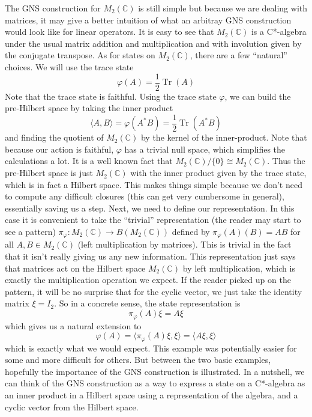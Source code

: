 \begin{example}
The GNS construction for \( M_2(\mathbb{C}) \) is still simple but because we are
dealing with matrices, it may give a better intuition of what an arbitray GNS construction
would look like for linear operators. It is easy to see that $M_2(\mathbb{C})$ is a
C*-algebra under the usual matrix addition and multiplication and with involution
given by the conjugate transpose. As for states on $M_2(\mathbb{C})$, there are
a few ``natural'' choices. We will use the trace state
\begin{equation*}
    \varphi(A) = \frac{1}{2} \operatorname{Tr}(A)
\end{equation*}
Note that the trace state is faithful. Using the trace state $\varphi$, we can
build the pre-Hilbert space by taking the inner product
\begin{equation*}
    \langle A,B \rangle = \varphi(A^*B) = \frac{1}{2}\operatorname{Tr}(A^*B)    
\end{equation*}
and finding the quotient of $M_2(\mathbb{C})$ by the kernel of the inner-product.
Note that because our action is faithful, $\varphi$ has a trivial null space, which
simplifies the calculations a lot. It is a well known fact that $M_2(\mathbb{C})/\{0\} \cong M_2(\mathbb{C})$.
Thus the pre-Hilbert space is just $M_2(\mathbb{C})$ with the inner product given
by the trace state, which is in fact a Hilbert space. This makes things simple because
we don't need to compute any difficult closures (this can get very cumbersome in general),
essentially saving us a step. Next, we need to define our representation. In this case
it is convenient to take the ``trivial'' representation (the reader may start to see a pattern)
$\pi_\varphi: M_2(\mathbb{C}) \to B(M_2(\mathbb{C}))$
defined by $\pi_\varphi(A)(B) = AB$ for all $A,B \in M_2(\mathbb{C})$
(left multiplication by matrices). This is trivial in the fact that it isn't really
giving us any new information. This representation just says that matrices act on the Hilbert space
$M_2(\mathbb{C})$ by left multiplication, which is exactly the multiplication operation
we expect. If the reader picked up on the pattern, it will be no surprise that for the
cyclic vector, we just take the identity matrix $\xi = I_2$. So in a concrete sense,
the state representation is
\begin{equation*}
    \pi_\varphi (A) \xi = A \xi
\end{equation*}
which gives us a natural extension to
\begin{equation*}
    \varphi(A) = \langle \pi_\varphi(A )\xi, \xi \rangle = \langle A\xi , \xi \rangle
\end{equation*}
which is exactly what we would expect. This example was potentially easier for some
and more difficult for others. But between the two basic examples, hopefully the 
importance of the GNS construction is illustrated. In a nutshell, we can think of 
the GNS construction as a way to express a state on a C*-algebra as an inner
product in a Hilbert space using a representation of the algebra, and a cyclic
vector from the Hilbert space.


\end{example}